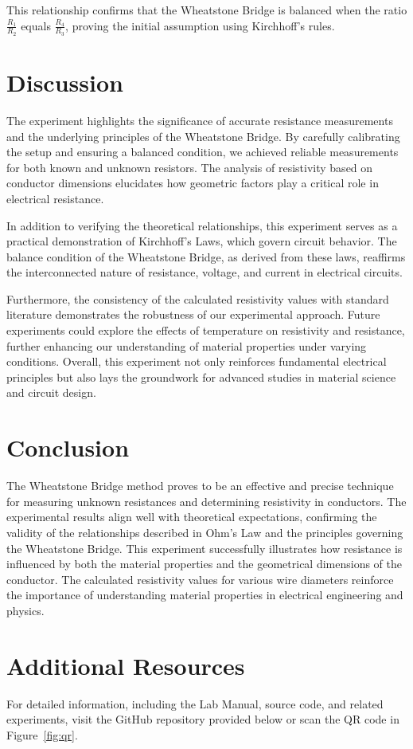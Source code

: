 \documentclass[journal]{IEEEtran}
\begin{document}
This relationship confirms that the Wheatstone Bridge is balanced when the ratio \( \frac{R_1}{R_2} \) equals \( \frac{R_4}{R_3} \), proving the initial assumption using Kirchhoff's rules.

\section{Discussion}
The experiment highlights the significance of accurate resistance measurements and the underlying principles of the Wheatstone Bridge. By carefully calibrating the setup and ensuring a balanced condition, we achieved reliable measurements for both known and unknown resistors. The analysis of resistivity based on conductor dimensions elucidates how geometric factors play a critical role in electrical resistance.

In addition to verifying the theoretical relationships, this experiment serves as a practical demonstration of Kirchhoff's Laws, which govern circuit behavior. The balance condition of the Wheatstone Bridge, as derived from these laws, reaffirms the interconnected nature of resistance, voltage, and current in electrical circuits.

Furthermore, the consistency of the calculated resistivity values with standard literature demonstrates the robustness of our experimental approach. Future experiments could explore the effects of temperature on resistivity and resistance, further enhancing our understanding of material properties under varying conditions. Overall, this experiment not only reinforces fundamental electrical principles but also lays the groundwork for advanced studies in material science and circuit design.
\section{Conclusion}
The Wheatstone Bridge method proves to be an effective and precise technique for measuring unknown resistances and determining resistivity in conductors. The experimental results align well with theoretical expectations, confirming the validity of the relationships described in Ohm’s Law and the principles governing the Wheatstone Bridge. This experiment successfully illustrates how resistance is influenced by both the material properties and the geometrical dimensions of the conductor. The calculated resistivity values for various wire diameters reinforce the importance of understanding material properties in electrical engineering and physics.
\section{Additional Resources}
For detailed information, including the Lab Manual, source code, and related experiments, visit the GitHub repository provided below or scan the QR code in Figure~\ref{fig:qr}.
\end{document}
